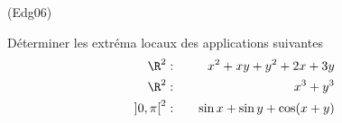 \begin{tiny}(Edg06)\end{tiny}
D{\'e}terminer les extr{\'e}ma locaux des applications suivantes
\begin{align*}
\R^{2} &:&\quad x^{2}+xy+y^{2}+2x+3y \\
\R^{2} &:&\quad x^{3}+y^{3} \\
\left] 0,\pi \right[ ^{2} &:&\quad \sin x+\sin y+\cos (x+y)
\end{align*}
